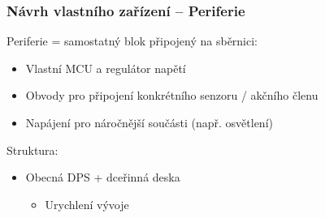 \documentclass[%
  12pt,       				%
	t,                  %
	aspectratio=1610,   %
	unicode,						%
]{beamer}				    	%
\begin{document}
\begin{frame}[fragile]
\end{frame}


\begin{frame}[fragile]
	\frametitle{Návrh vlastního zařízení -- Periferie}
		Periferie = samostatný blok připojený na sběrnici:\\[1ex]
		\begin{itemize}
			\item Vlastní MCU a regulátor napětí
			\item Obvody pro připojení konkrétního senzoru / akčního členu 
			\item Napájení pro náročnější součásti (např. osvětlení)
		\end{itemize}
		\vspace{1.5ex}%
		Struktura:\\[1ex]
		\begin{itemize}
			\item Obecná DPS + dceřinná deska
			\begin{itemize}
				\item Urychlení vývoje
			\end{itemize}
		\end{itemize}

\end{frame}
\end{document}
